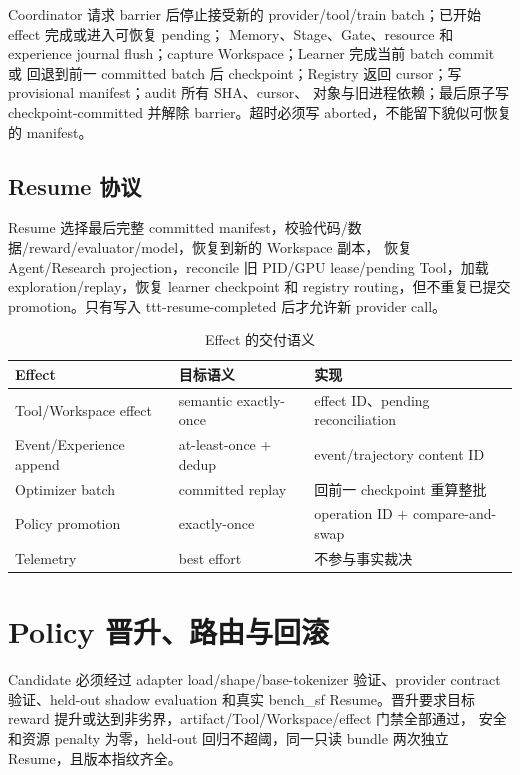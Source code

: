 \documentclass[UTF8,11pt,a4paper]{ctexart}
\begin{document}
Coordinator 请求 barrier 后停止接受新的 provider/tool/train batch；已开始 effect 完成或进入可恢复 pending；
Memory、Stage、Gate、resource 和 experience journal flush；capture Workspace；Learner 完成当前 batch commit 或
回退到前一 committed batch 后 checkpoint；Registry 返回 cursor；写 provisional manifest；audit 所有 SHA、cursor、
对象与旧进程依赖；最后原子写 checkpoint-committed 并解除 barrier。超时必须写 aborted，不能留下貌似可恢复的
manifest。

\subsection{Resume 协议}

Resume 选择最后完整 committed manifest，校验代码/数据/reward/evaluator/model，恢复到新的 Workspace 副本，
恢复 Agent/Research projection，reconcile 旧 PID/GPU lease/pending Tool，加载 exploration/replay，恢复 learner
checkpoint 和 registry routing，但不重复已提交 promotion。只有写入 ttt-resume-completed 后才允许新 provider call。

\begin{table}[htbp]
  \centering
  \caption{Effect 的交付语义}
  \begin{tabularx}{\textwidth}{L{3.0cm}L{3.0cm}Y}
    \toprule
    Effect & 目标语义 & 实现 \\
    \midrule
    Tool/Workspace effect & semantic exactly-once & effect ID、pending reconciliation \\
    Event/Experience append & at-least-once + dedup & event/trajectory content ID \\
    Optimizer batch & committed replay & 回前一 checkpoint 重算整批 \\
    Policy promotion & exactly-once & operation ID + compare-and-swap \\
    Telemetry & best effort & 不参与事实裁决 \\
    \bottomrule
  \end{tabularx}
\end{table}

\section{Policy 晋升、路由与回滚}

Candidate 必须经过 adapter load/shape/base-tokenizer 验证、provider contract 验证、held-out shadow evaluation
和真实 bench\_sf Resume。晋升要求目标 reward 提升或达到非劣界，artifact/Tool/Workspace/effect 门禁全部通过，
安全和资源 penalty 为零，held-out 回归不超阈，同一只读 bundle 两次独立 Resume，且版本指纹齐全。
\end{document}
